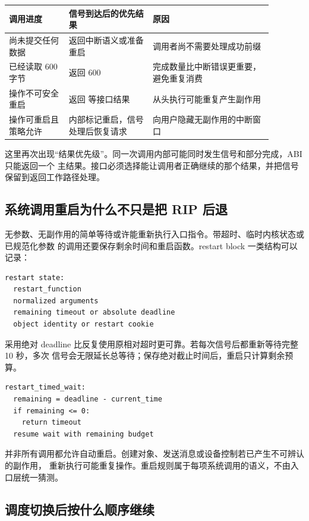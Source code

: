 \begin{longtable}{|L{0.20\linewidth}|L{0.28\linewidth}|L{0.40\linewidth}|}
\hline
调用进度 & 信号到达后的优先结果 & 原因 \\ \hline
尚未提交任何数据 & 返回中断语义或准备重启 & 调用者尚不需要处理成功前缀 \\ \hline
已经读取 600 字节 & 返回 600 & 完成数量比中断错误更重要，避免重复消费 \\ \hline
操作不可安全重启 & 返回  等接口结果 & 从头执行可能重复产生副作用 \\ \hline
操作可重启且策略允许 & 内部标记重启，信号处理后恢复请求 & 向用户隐藏无副作用的中断窗口 \\ \hline
\end{longtable}

这里再次出现“结果优先级”。同一次调用内部可能同时发生信号和部分完成，ABI 只能返回一个
主结果。接口必须选择能让调用者正确继续的那个结果，并把信号保留到返回工作路径处理。

\subsection{系统调用重启为什么不只是把 RIP 后退}

无参数、无副作用的简单等待或许能重新执行入口指令。带超时、临时内核状态或已规范化参数
的调用还要保存剩余时间和重启函数。restart block 一类结构可以记录：

\begin{lstlisting}
restart state:
  restart_function
  normalized arguments
  remaining timeout or absolute deadline
  object identity or restart cookie
\end{lstlisting}

采用绝对 deadline 比反复使用原相对超时更可靠。若每次信号后都重新等待完整 10 秒，多次
信号会无限延长总等待；保存绝对截止时间后，重启只计算剩余预算。

\begin{lstlisting}
restart_timed_wait:
  remaining = deadline - current_time
  if remaining <= 0:
    return timeout
  resume wait with remaining budget
\end{lstlisting}

并非所有调用都允许自动重启。创建对象、发送消息或设备控制若已产生不可辨认的副作用，
重新执行可能重复操作。重启规则属于每项系统调用的语义，不由入口层统一猜测。

\subsection{调度切换后按什么顺序继续}

